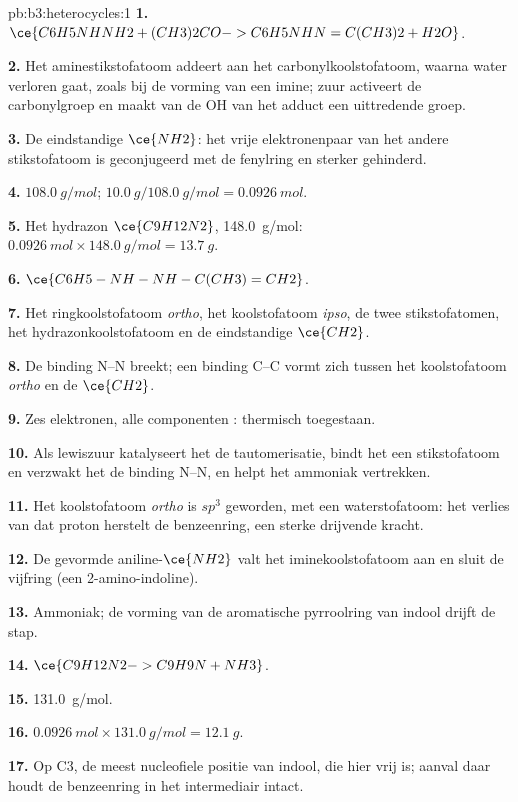\begin{solution}{pb:b3:heterocycles:1}
\textbf{1.} $\ce{C6H5NHNH2 + (CH3)2CO -> C6H5NHN=C(CH3)2 + H2O}$.

\textbf{2.} Het aminestikstofatoom addeert aan het carbonylkoolstofatoom,
waarna water verloren gaat, zoals bij de vorming van een imine; zuur
activeert de carbonylgroep en maakt van de OH van het adduct een
uittredende groep.

\textbf{3.} De eindstandige $\ce{NH2}$: het vrije elektronenpaar van het andere
stikstofatoom is geconjugeerd met de fenylring en sterker gehinderd.

\textbf{4.} $\qty{108.0}{g/mol}$; $\qty{10.0}{g}/\qty{108.0}{g/mol} = \qty{0.0926}{mol}$.

\textbf{5.} Het hydrazon $\ce{C9H12N2}$, \qty{148.0}{g/mol}: $\qty{0.0926}{mol} \times \qty{148.0}{g/mol} = \qty{13.7}{g}$.

\textbf{6.} $\ce{C6H5-NH-NH-C(CH3)=CH2}$.

\textbf{7.} Het ringkoolstofatoom \textit{ortho}, het koolstofatoom \textit{ipso}, de twee stikstofatomen, het
hydrazonkoolstofatoom en de eindstandige $\ce{CH2}$.

\textbf{8.} De binding N--N breekt; een binding C--C vormt zich tussen het koolstofatoom \textit{ortho} en de $\ce{CH2}$.

\textbf{9.} Zes elektronen, alle componenten : thermisch toegestaan.

\textbf{10.} Als lewiszuur katalyseert het de tautomerisatie, bindt het
een stikstofatoom en verzwakt het de binding N--N, en helpt het
ammoniak vertrekken.

\textbf{11.} Het koolstofatoom \textit{ortho} is $sp^3$ geworden, met een waterstofatoom: het verlies van dat proton
herstelt de benzeenring, een sterke drijvende kracht.

\textbf{12.} De gevormde aniline-$\ce{NH2}$ valt het iminekoolstofatoom aan en sluit de
vijfring (een 2-amino-indoline).

\textbf{13.} Ammoniak; de vorming van de aromatische pyrroolring van indool
drijft de stap.

\textbf{14.} $\ce{C9H12N2 -> C9H9N + NH3}$.

\textbf{15.} \qty{131.0}{g/mol}.

\textbf{16.} $\qty{0.0926}{mol} \times \qty{131.0}{g/mol} = \qty{12.1}{g}$.

\textbf{17.} Op C3, de meest nucleofiele positie van indool, die hier vrij
is; aanval daar houdt de benzeenring in het intermediair intact.


\end{solution}
